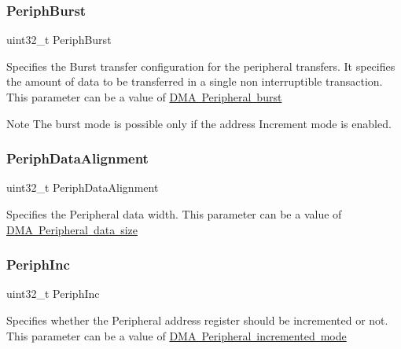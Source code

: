 \subsubsection{\texorpdfstring{Periph\+Burst}{PeriphBurst}}
{\footnotesize\ttfamily uint32\+\_\+t Periph\+Burst}

Specifies the Burst transfer configuration for the peripheral transfers. It specifies the amount of data to be transferred in a single non interruptible transaction. This parameter can be a value of \mbox{\hyperlink{group___d_m_a___peripheral__burst}{D\+MA Peripheral burst}} \begin{DoxyNote}{Note}
The burst mode is possible only if the address Increment mode is enabled. 
\end{DoxyNote}
\mbox{\label{struct_d_m_a___init_type_def_aca5b89241171c093fd0fc6dacf72683c}} 
\subsubsection{\texorpdfstring{Periph\+Data\+Alignment}{PeriphDataAlignment}}
{\footnotesize\ttfamily uint32\+\_\+t Periph\+Data\+Alignment}

Specifies the Peripheral data width. This parameter can be a value of \mbox{\hyperlink{group___d_m_a___peripheral__data__size}{D\+MA Peripheral data size}} \mbox{\label{struct_d_m_a___init_type_def_a4925ca3ceb52340daddc92817dc304d9}} 
\subsubsection{\texorpdfstring{Periph\+Inc}{PeriphInc}}
{\footnotesize\ttfamily uint32\+\_\+t Periph\+Inc}

Specifies whether the Peripheral address register should be incremented or not. This parameter can be a value of \mbox{\hyperlink{group___d_m_a___peripheral__incremented__mode}{D\+MA Peripheral incremented mode}} \mbox{\label{struct_d_m_a___init_type_def_a72acf77c0b19359eb70764505ae4bd70}} 
